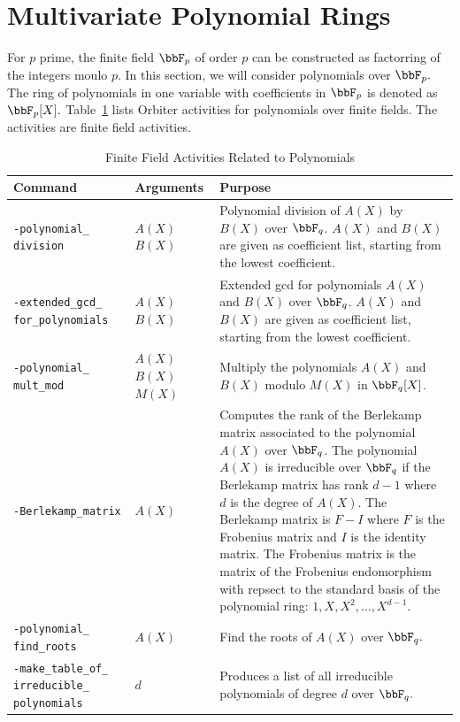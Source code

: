 \clearpage

\section{Multivariate Polynomial Rings}
\label{sec:ring:theory:multivariate}




\bigskip



\clearpage


For $p$ prime, the finite field $\bbF_p$ of 
order $p$ can be constructed as factorring of the integers moulo $p$. 
In this section, we will consider polynomials over $\bbF_p.$
The ring of polynomials in one variable with coefficients in $\bbF_p$ is denoted as $\bbF_p[X].$ 
Table~\ref{tab:finitefield:activities:poly} lists Orbiter activities for polynomials over finite fields. The activities are finite field activities.
\begin{table}
	\begin{center}
	\begin{tabular}{|p{4cm}|p{3cm}|p{7cm}|}
		\hline
		Command & Arguments & Purpose \\
		\hline
		\hline
		\verb'-polynomial_' \verb'division' & $A(X)$ $B(X)$  & Polynomial division of $A(X)$ by $B(X)$ over $\bbF_q$. $A(X)$ and $B(X)$ are given as coefficient list, starting from the lowest coefficient. \\
		\hline
		\verb'-extended_gcd_' \verb'for_polynomials' & $A(X)$ $B(X)$  & Extended gcd for polynomials $A(X)$ and $B(X)$ over $\bbF_q$. $A(X)$ and $B(X)$ are given as coefficient list, starting from the lowest coefficient. \\
		\hline
		\verb'-polynomial_' \verb'mult_mod' & $A(X)$ $B(X)$ $M(X)$ &  Multiply the polynomials $A(X)$ and $B(X)$ modulo $M(X)$ in $\bbF_q[X]$. \\
		\hline
		\verb'-Berlekamp_matrix' & $A(X)$  &  Computes the rank of the Berlekamp matrix associated to the polynomial $A(X)$ over $\bbF_q$. The polynomial $A(X)$ is irreducible over $\bbF_q$ if the Berlekamp matrix has rank $d-1$ where $d$ is the degree of $A(X).$ The Berlekamp matrix is $F-I$ where $F$ is the Frobenius matrix and $I$ is the identity matrix. The Frobenius matrix is the matrix of the Frobenius endomorphism with repsect to the standard basis of the polynomial ring: $1,X,X^2,\ldots,X^{d-1}.$\\
		\hline
		\verb'-polynomial_' \verb'find_roots' & $A(X)$  &  Find the roots of $A(X)$ over $\bbF_q.$  \\
		\hline
		\verb'-make_table_of_' \verb'irreducible_' \verb'polynomials' &  $d$ &  Produces a list of all irreducible polynomials of degree $d$ over $\bbF_q.$  \\
		\hline
		\end{tabular}
	\end{center}
	\caption{\label{tab:finitefield:activities:poly}Finite Field Activities Related to Polynomials}
	\end{table}
